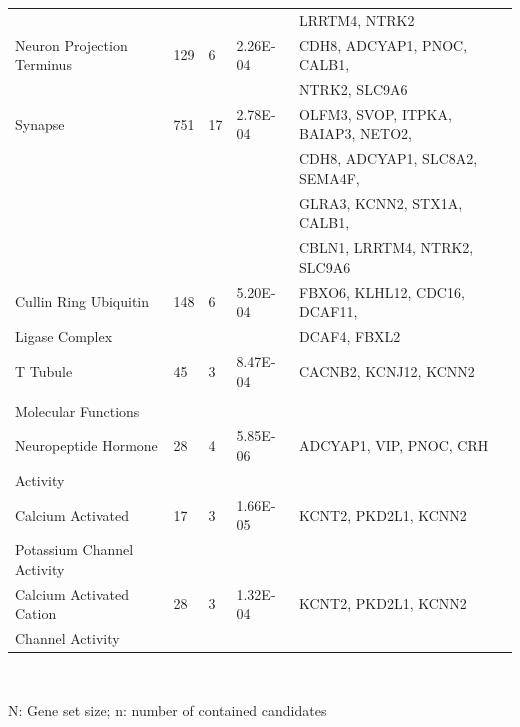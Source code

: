 \begin{refsection}
\begin{table}[H]
\begin{tabular}{@{}lllll@{}}
                           &     &    &            & LRRTM4, NTRK2                      \\
Neuron Projection Terminus & 129 & 6  & 2.26E-04   & CDH8, ADCYAP1, PNOC, CALB1,        \\
                           &     &    &            & NTRK2, SLC9A6                      \\
Synapse                    & 751 & 17 & 2.78E-04   & OLFM3, SVOP, ITPKA, BAIAP3, NETO2, \\
                           &     &    &            & CDH8, ADCYAP1, SLC8A2, SEMA4F,     \\
                           &     &    &            & GLRA3, KCNN2, STX1A, CALB1,        \\
                           &     &    &            & CBLN1, LRRTM4, NTRK2, SLC9A6       \\
Cullin Ring Ubiquitin      & 148 & 6  & 5.20E-04   & FBXO6, KLHL12, CDC16, DCAF11,      \\
Ligase Complex             &     &    &            & DCAF4, FBXL2                       \\
T Tubule                   & 45  & 3  & 8.47E-04   & CACNB2, KCNJ12, KCNN2              \\
                           &     &    &            &                                    \\
Molecular Functions        &     &    &            &                                    \\
Neuropeptide Hormone       & 28  & 4  & 5.85E-06   & ADCYAP1, VIP, PNOC, CRH            \\
Activity                   &     &    &            &                                    \\
Calcium Activated          & 17  & 3  & 1.66E-05   & KCNT2, PKD2L1, KCNN2               \\
Potassium Channel Activity &     &    &            &                                    \\
Calcium Activated Cation   & 28  & 3  & 1.32E-04   & KCNT2, PKD2L1, KCNN2               \\ 
Channel Activity           &     &    &            &                                    \\ \hline
\end{tabular}\\
{\begin{flushleft}
\scriptsize N: Gene set size; n: number of contained candidates
\end{flushleft}}
\end{table}



\end{refsection}

